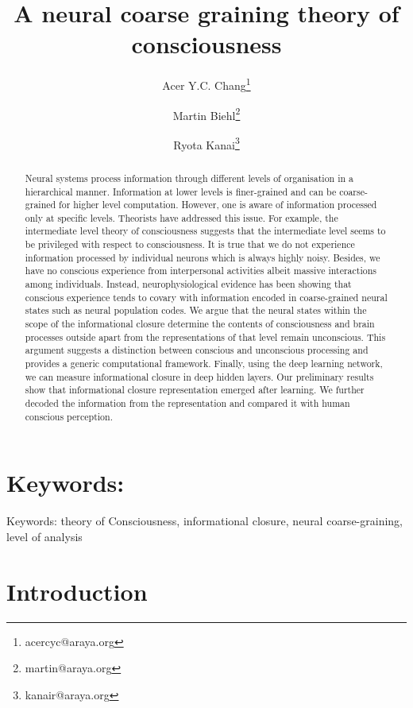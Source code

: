 \documentclass[utf8]{article}
\title{A neural coarse graining theory of consciousness}
\author[1]{Acer Y.C. Chang\thanks{acercyc@araya.org}}
\author[1]{Martin Biehl\thanks{martin@araya.org}}
\author[1]{Ryota Kanai\thanks{kanair@araya.org }}
\affil[1]{ARAYA, Inc., Tokyo, Japan}
\begin{document}
	\maketitle
	\tableofcontents


	\begin{abstract}
		Neural systems process information through different levels of organisation in a hierarchical manner. Information at lower levels is finer-grained and can be coarse-grained for higher level computation. However, one is aware of information processed only at specific levels. Theorists have addressed this issue. For example, the intermediate level theory of consciousness suggests that the intermediate level seems to be privileged with respect to consciousness. It is true that we do not experience information processed by individual neurons which is always highly noisy. Besides, we have no conscious experience from interpersonal activities albeit massive interactions among individuals. Instead, neurophysiological evidence has been showing that conscious experience tends to covary with information encoded in coarse-grained neural states such as neural population codes. We argue that the neural states within the scope of the informational closure determine the contents of consciousness and brain processes outside apart from the representations of that level remain unconscious. This argument suggests a distinction between conscious and unconscious processing and provides a generic computational framework. Finally, using the deep learning network, we can measure informational closure in deep hidden layers. Our preliminary results show that informational closure representation emerged after learning. We further decoded the information from the representation and compared it with human conscious perception.
	\end{abstract}
	
	
	\section*{Keywords:} 
	Keywords: theory of Consciousness, informational closure, neural coarse-graining, level of analysis
	
	
	
	\section{Introduction}	
	
\end{document}
